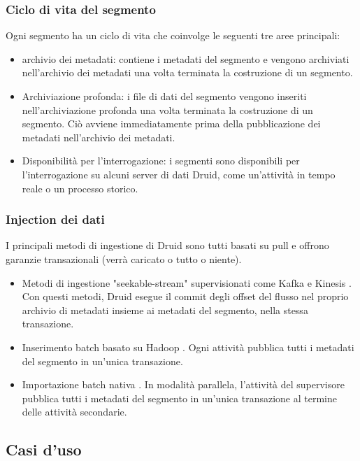 \documentclass{article}
\begin{document}
\subsubsection{Ciclo di vita del segmento}
Ogni segmento ha un ciclo di vita che coinvolge le seguenti tre aree principali:
\begin{itemize}
    \item archivio dei metadati: contiene i metadati del segmento e vengono archiviati nell'archivio dei metadati una volta terminata la costruzione di un segmento.
    \item Archiviazione profonda: i file di dati del segmento vengono inseriti nell'archiviazione profonda una volta terminata la costruzione di un segmento. Ciò avviene immediatamente prima della pubblicazione dei metadati nell'archivio dei metadati.
    \item Disponibilità per l'interrogazione: i segmenti sono disponibili per l'interrogazione su alcuni server di dati Druid, come un'attività in tempo reale o un processo storico.
\end{itemize}
\subsubsection{Injection dei dati}
 I principali metodi di ingestione di Druid sono tutti basati su pull e offrono garanzie transazionali (verrà caricato o tutto o niente).
 \begin{itemize}
     \item Metodi di ingestione "seekable-stream" supervisionati come Kafka e Kinesis . Con questi metodi, Druid esegue il commit degli offset del flusso nel proprio archivio di metadati insieme ai metadati del segmento, nella stessa transazione.
    \item Inserimento batch basato su Hadoop  . Ogni attività pubblica tutti i metadati del segmento in un'unica transazione.
    \item Importazione batch nativa . In modalità parallela, l'attività del supervisore pubblica tutti i metadati del segmento in un'unica transazione al termine delle attività secondarie.
 \end{itemize}
\subsection{Casi d'uso}
\end{document}
